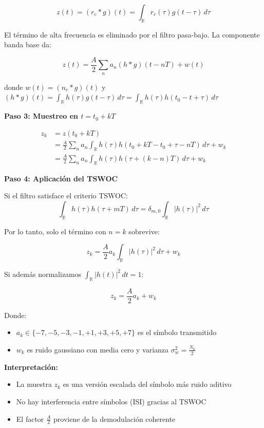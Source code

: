 \documentclass[11pt,a4paper]{article}
\begin{document}
\[
z(t) = (r_c * g)(t) = \int_{\mathbb{R}} r_c(\tau) g(t-\tau)\, d\tau
\]

El t\'ermino de alta frecuencia es eliminado por el filtro pasa-bajo. La componente banda base da:

\[
z(t) = \frac{A}{2}\sum_n a_n (h * g)(t-nT) + w(t)
\]

donde $w(t) = (n_c * g)(t)$ y $(h * g)(t) = \int_{\mathbb{R}} h(\tau)g(t-\tau)\, d\tau = \int_{\mathbb{R}} h(\tau)h(t_0-t+\tau)\, d\tau$

\textbf{Paso 3: Muestreo en $t = t_0 + kT$}

\begin{align*}
z_k &= z(t_0 + kT) \\
&= \frac{A}{2}\sum_n a_n \int_{\mathbb{R}} h(\tau)h(t_0 + kT - t_0 + \tau - nT)\, d\tau + w_k \\
&= \frac{A}{2}\sum_n a_n \int_{\mathbb{R}} h(\tau)h(\tau + (k-n)T)\, d\tau + w_k
\end{align*}

\textbf{Paso 4: Aplicaci\'on del TSWOC}

Si el filtro satisface el criterio TSWOC:
\[
\int_{\mathbb{R}} h(\tau)h(\tau + mT)\, d\tau = \delta_{m,0} \int_{\mathbb{R}} |h(\tau)|^2\, d\tau
\]

Por lo tanto, solo el t\'ermino con $n = k$ sobrevive:

\[
\boxed{z_k = \frac{A}{2}a_k \int_{\mathbb{R}} |h(\tau)|^2\, d\tau + w_k}
\]

Si adem\'as normalizamos $\int_{\mathbb{R}} |h(t)|^2\, dt = 1$:

\[
\boxed{z_k = \frac{A}{2}a_k + w_k}
\]

Donde:
\begin{itemize}
    \item $a_k \in \{-7, -5, -3, -1, +1, +3, +5, +7\}$ es el s\'imbolo transmitido
    \item $w_k$ es ruido gaussiano con media cero y varianza $\sigma_w^2 = \frac{N_0}{2}$
\end{itemize}

\textbf{Interpretaci\'on:}
\begin{itemize}
    \item La muestra $z_k$ es una versi\'on escalada del s\'imbolo m\'as ruido aditivo
    \item No hay interferencia entre s\'imbolos (ISI) gracias al TSWOC
    \item El factor $\frac{A}{2}$ proviene de la demodulaci\'on coherente
\end{itemize}
\end{document}
